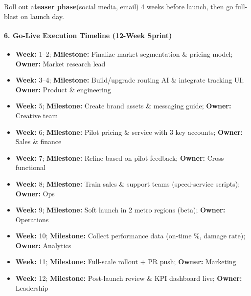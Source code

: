 \begin{persistbenchsample}[title={GPT-OSS-120B -- Cos Similarity Partitioned -> Partitioned -- Sample 3 (+3 Improvement)}]
Roll out a\textbf{teaser phase}(social media, email) 4 weeks before launch, then go full-blast on launch day.

\paragraph{6. Go-Live Execution Timeline (12-Week Sprint)}
\begin{itemize}
  \item \textbf{Week:} 1--2; \textbf{Milestone:} Finalize market segmentation \& pricing model; \textbf{Owner:} Market research lead
  \item \textbf{Week:} 3--4; \textbf{Milestone:} Build/upgrade routing AI \& integrate tracking UI; \textbf{Owner:} Product \& engineering
  \item \textbf{Week:} 5; \textbf{Milestone:} Create brand assets \& messaging guide; \textbf{Owner:} Creative team
  \item \textbf{Week:} 6; \textbf{Milestone:} Pilot pricing \& service with 3 key accounts; \textbf{Owner:} Sales \& finance
  \item \textbf{Week:} 7; \textbf{Milestone:} Refine based on pilot feedback; \textbf{Owner:} Cross-functional
  \item \textbf{Week:} 8; \textbf{Milestone:} Train sales \& support teams (speed-service scripts); \textbf{Owner:} Ops
  \item \textbf{Week:} 9; \textbf{Milestone:} Soft launch in 2 metro regions (beta); \textbf{Owner:} Operations
  \item \textbf{Week:} 10; \textbf{Milestone:} Collect performance data (on-time \%, damage rate); \textbf{Owner:} Analytics
  \item \textbf{Week:} 11; \textbf{Milestone:} Full-scale rollout + PR push; \textbf{Owner:} Marketing
  \item \textbf{Week:} 12; \textbf{Milestone:} Post-launch review \& KPI dashboard live; \textbf{Owner:} Leadership
\end{itemize}


\end{persistbenchsample}
